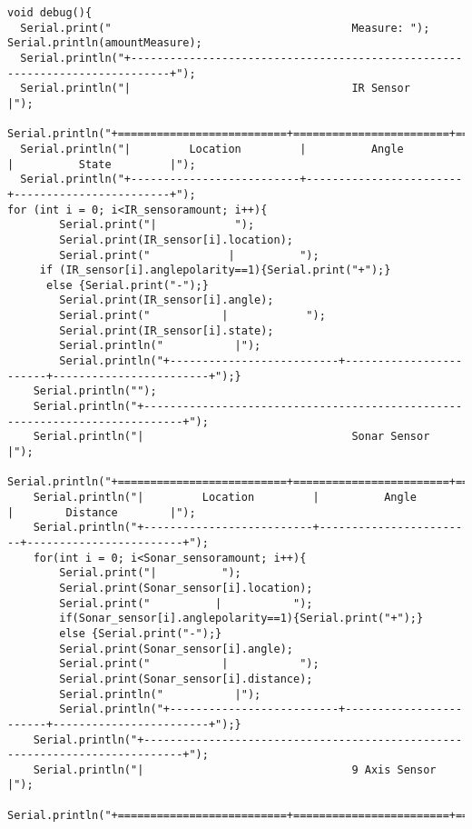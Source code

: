 \begin{lstlisting}
void debug(){
  Serial.print("                                     Measure: "); Serial.println(amountMeasure);
  Serial.println("+----------------------------------------------------------------------------+");
  Serial.println("|                                  IR Sensor                                 |");
  Serial.println("+==========================+========================+========================+");
  Serial.println("|         Location         |          Angle         |          State         |");
  Serial.println("+--------------------------+------------------------+------------------------+");
for (int i = 0; i<IR_sensoramount; i++){
        Serial.print("|            ");
        Serial.print(IR_sensor[i].location);
        Serial.print("            |          ");
     if (IR_sensor[i].anglepolarity==1){Serial.print("+");}
      else {Serial.print("-");}
        Serial.print(IR_sensor[i].angle);
        Serial.print("           |            ");
        Serial.print(IR_sensor[i].state);
        Serial.println("           |");
        Serial.println("+--------------------------+------------------------+------------------------+");}
    Serial.println("");
    Serial.println("+----------------------------------------------------------------------------+");
    Serial.println("|                                Sonar Sensor                                |");
    Serial.println("+==========================+========================+========================+");
    Serial.println("|         Location         |          Angle         |        Distance        |");
    Serial.println("+--------------------------+------------------------+------------------------+");
    for(int i = 0; i<Sonar_sensoramount; i++){
        Serial.print("|          ");
        Serial.print(Sonar_sensor[i].location);
        Serial.print("          |           ");
        if(Sonar_sensor[i].anglepolarity==1){Serial.print("+");}
        else {Serial.print("-");}
        Serial.print(Sonar_sensor[i].angle);
        Serial.print("           |           ");
        Serial.print(Sonar_sensor[i].distance);
        Serial.println("           |");
        Serial.println("+--------------------------+------------------------+------------------------+");}
    Serial.println("+----------------------------------------------------------------------------+");
    Serial.println("|                                9 Axis Sensor                               |");
    Serial.println("+==========================+========================+========================+");

\end{lstlisting}
